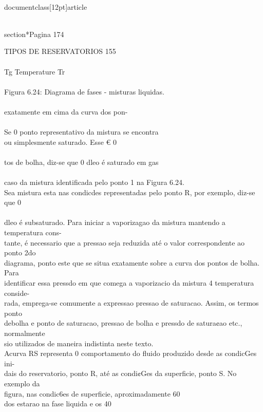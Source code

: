 \\documentclass[12pt]{article}
\begin{document}
\\section*{Pagina 174}

TIPOS DE RESERVATORIOS 155\\
\\
Tg Temperature Tr\\
\\
Figura 6.24: Diagrama de fases - misturas liquidas.\\
\\
exatamente em cima da curva dos pon-\\
\\
Se 0 ponto representativo da mistura se encontra\\
ou simplesmente saturado. Esse € 0\\
\\
tos de bolha, diz-se que 0 dleo é saturado em gas\\
\\
caso da mistura identificada pelo ponto 1 na Figura 6.24.\\
Sea mistura esta nas condicdes representadas pelo ponto R, por exemplo, diz-se que 0\\
\\
dleo é subsaturado. Para iniciar a vaporizagao da mistura mantendo a temperatura cons-\\
tante, é necessario que a pressao seja reduzida até o valor correspondente ao ponto 2do\\
diagrama, ponto este que se situa exatamente sobre a curva dos pontos de bolha. Para\\
identificar essa pressdo em que comega a vaporizacio da mistura 4 temperatura conside-\\
rada, emprega-se comumente a expressao pressao de saturacao. Assim, os termos ponto\\
debolha e ponto de saturacao, pressao de bolha e pressdo de satura¢ao etc., normalmente\\
sio utilizados de maneira indistinta neste texto.\\
Acurva RS representa 0 comportamento do fluido produzido desde as condicGes ini-\\
dais do reservatorio, ponto R, até as condi¢Ges da superficie, ponto S. No exemplo da\\
figura, nas condic6es de superficie, aproximadamente 60\\%
dos estarao na fase liquida e os 40\\%
\end{document}
